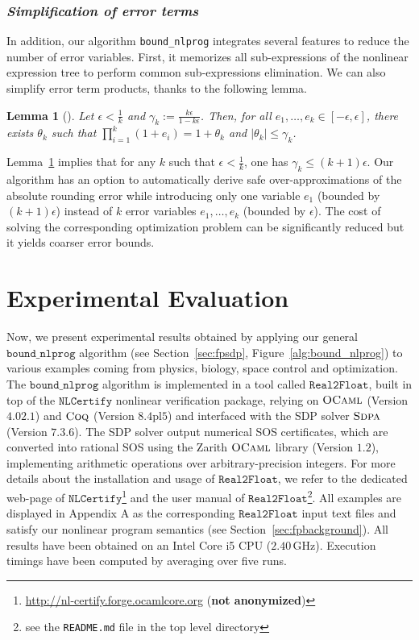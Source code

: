 \documentclass[preprint]{sigplanconf}
\newcommand{\code}[1]{\lstinline{#1}}
\newcommand{\boundnlprog}{\mathtt{bound\_nlprog}}
\newcommand{\realtofloat}{\mathtt{Real2Float}}
\newcommand{\coq}{\text{\sc Coq}}
\newcommand{\ocaml}{\text{\sc OCaml}}
\newcommand{\sdpa}{\text{\sc Sdpa}}
\newcommand{\nlcertify}{\mathtt{NLCertify}}
\newtheorem{lemma}[theorem]{Lemma}
\theoremstyle{plain}
\begin{document}
\subsubsection*{\textit{Simplification of error terms}}
%
In addition, our algorithm \code{bound_nlprog} integrates several features to reduce the number of error variables. First, it memorizes all sub-expressions of the nonlinear expression tree to perform common sub-expressions elimination. 
We can also simplify error term products, thanks to the following lemma.
\begin{lemma}[]
\label{th:redproduct}
Let $\epsilon < \frac{1}{k}$ and $\gamma_k := \frac{k \epsilon}{1 - k \epsilon}$. Then, for all $e_1, \dots, e_k \in [-\epsilon, \epsilon]$, there exists $\theta_k$ such that ${\prod_{i=1}^k (1 + e_i) = 1 + \theta_k}$ and $\mid \theta_k \mid \leq \gamma_k$.
\end{lemma}
%
Lemma~\ref{th:redproduct} implies that for any $k$ such that $\epsilon < \frac{1}{k}$, one has $\gamma_k \leq (k + 1) \epsilon$. Our algorithm has an option to automatically derive safe over-approximations of the absolute rounding error while introducing only one variable $e_1$ (bounded by $(k + 1) \epsilon$) instead of $k$ error variables $e_1, \dots, e_k$ (bounded by $\epsilon$). The cost of solving the corresponding optimization problem can be significantly reduced but it yields coarser error bounds.
%
\section{Experimental Evaluation}
\label{sec:benchs}
%
Now, we present experimental results obtained by applying our general $\boundnlprog$ algorithm (see Section~\ref{sec:fpsdp}, Figure~\ref{alg:bound_nlprog}) to various examples coming from physics, biology, space control and optimization. 
The  $\boundnlprog$ algorithm is implemented in a tool called $\realtofloat$, built in top of the $\nlcertify$ nonlinear verification package, relying on $\ocaml$ (Version $4.02.1$) and $\coq$ (Version $8.4\text{pl}5$) and interfaced with the SDP solver $\sdpa$ (Version $7.3.6$). The SDP solver output numerical SOS certificates, which are converted into rational SOS using the {\sc Zarith} $\ocaml$ library (Version $1.2$), implementing arithmetic operations over arbitrary-precision integers.
For more details about the installation and usage of $\realtofloat$, we refer to the dedicated web-page of $\nlcertify$\footnote{\url{http://nl-certify.forge.ocamlcore.org} (\textbf{not anonymized})} and the user manual of $\realtofloat$\footnote{see the \texttt{README.md} file in the top level directory}. 
All examples are displayed in Appendix A as the corresponding $\realtofloat$ input text files and satisfy our nonlinear program semantics (see Section~\ref{sec:fpbackground}). All results have been obtained on an Intel Core i5 CPU ($2.40\, $GHz). Execution timings have been computed by averaging over five runs.
%
\end{document}

